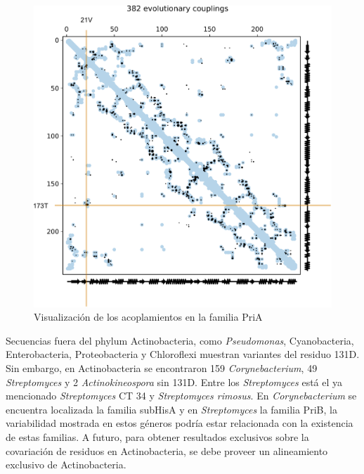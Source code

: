 \documentclass[12pt,twoside]{reedthesis}
\begin{document}
  \begin{figure}[h!tbp]
  \centering
  \includegraphics[angle = 0,scale = .5]{chapter4/Couplings/HIS4_STRCO_1-200/align/couplings.pdf}
  \caption[Visualización de los acoplamientos en la familia PriA]{\footnotesize{Visualización de los acoplamientos en la familia PriA}}
  \label{fig:couplings}
  \end{figure}
  
  Secuencias fuera del phylum Actinobacteria, como \emph{Pseudomonas},
  Cyanobacteria, Enterobacteria, Proteobacteria y Chloroflexi muestran
  variantes del residuo 131D. Sin embargo, en Actinobacteria se
  encontraron 159 \emph{Corynebacterium}, 49 \emph{Streptomyces} y 2
  \emph{Actinokineospora} sin 131D. Entre los \emph{Streptomyces} está el
  ya mencionado \emph{Streptomyces } CT 34 y \emph{Streptomyces rimosus}.
  En \emph{Corynebacterium} se encuentra localizada la familia subHisA y
  en \emph{Streptomyces} la familia PriB, la variabilidad mostrada en
  estos géneros podría estar relacionada con la existencia de estas
  familias. A futuro, para obtener resultados exclusivos sobre la
  covariación de residuos en Actinobacteria, se debe proveer un
  alineamiento exclusivo de Actinobacteria.
  
\end{document}
